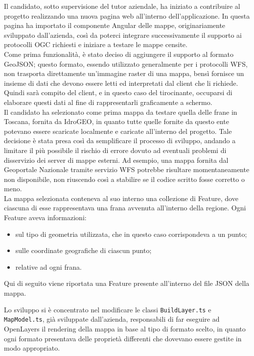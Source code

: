 Il candidato, sotto supervisione del tutor aziendale, ha iniziato a contribuire al progetto realizzando una nuova pagina web all'interno dell'applicazione. In questa pagina ha importato il componente Angular delle mappe, originariamente sviluppato dall'azienda, così da poterci integrare successivamente il supporto ai protocolli OGC richiesti e iniziare a testare le mappe censite.
\\Come prima funzionalità, è stato deciso di aggiungere il supporto al formato GeoJSON; questo formato, essendo utilizzato generalmente per i protocolli WFS, non trasporta direttamente un'immagine raster di una mappa, bensì fornisce un insieme di dati che devono essere letti ed interpretati dal client che li richiede. Quindi sarà compito del client, e in questo caso del tirocinante, occuparsi di elaborare questi dati al fine di rappresentarli graficamente a schermo. 
\\Il candidato ha selezionato come prima mappa da testare quella delle frane in Toscana, fornita da IdroGEO, in quanto tutte quelle fornite da questo ente potevano essere scaricate localmente e caricate all'interno del progetto. Tale decisione è stata presa così da semplificare il processo di sviluppo, andando a limitare il più possibile il rischio di errore dovuto ad eventuali problemi di disservizio dei server di mappe esterni. Ad esempio, una mappa fornita dal Geoportale Nazionale tramite servizio WFS potrebbe risultare momentaneamente non disponibile, non riuscendo così a stabilire se il codice scritto fosse corretto o meno.
\\La mappa selezionata conteneva al suo interno una collezione di Feature, dove ciascuna di esse rappresentava una frana avvenuta all'interno della regione. Ogni Feature aveva informazioni:
\begin{itemize}
    \item sul tipo di geometria utilizzata, che in questo caso corrispondeva a un punto;
    \item sulle coordinate geografiche di ciascun punto;
    \item relative ad ogni frana.    
\end{itemize}
Qui di seguito viene riportata una Feature presente all'interno del file JSON della mappa.

Lo sviluppo si è concentrato nel modificare le classi \verb|BuildLayer.ts| e \verb|MapModel.ts|, già sviluppate dall'azienda, responsabili di far eseguire ad OpenLayers il rendering della mappa in base al tipo di formato scelto, in quanto ogni formato presentava delle proprietà differenti che dovevano essere gestite in modo appropriato. 
